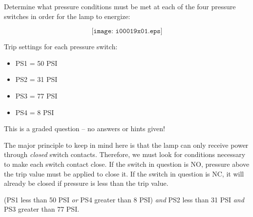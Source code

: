 

Determine what pressure conditions must be met at each of the four pressure switches in order for the lamp to energize:

$$\texttt{[image: i00019x01.eps]}$$

\noindent
Trip settings for each pressure switch:

\begin{itemize}
\item{} PS1 = 50 PSI
\item{} PS2 = 31 PSI
\item{} PS3 = 77 PSI
\item{} PS4 = 8 PSI
\end{itemize}

\vfil

\eject






This is a graded question -- no answers or hints given!







The major principle to keep in mind here is that the lamp can only receive power through {\it closed} switch contacts.  Therefore, we must look for conditions necessary to make each switch contact close.  If the switch in question is NO, pressure above the trip value must be applied to close it.  If the switch in question is NC, it will already be closed if pressure is less than the trip value.

\vskip 10pt

(PS1 less than 50 PSI {\it or} PS4 greater than 8 PSI) {\it and} PS2 less than 31 PSI {\it and} PS3 greater than 77 PSI.




